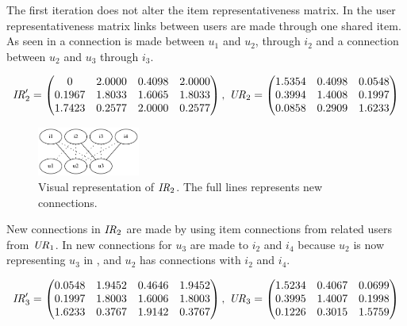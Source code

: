 \FloatBarrier

The first iteration does not alter the item representativeness matrix. In the user representativeness matrix links between users are made through one shared item.  As seen in  a connection is made between $u_1$ and $u_2$, through $i_2$ and a connection between $u_2$ and $u_3$ through $i_3$.

\[
    \mathit{IR}'_2 = \begin{pmatrix}
             0 &  2.0000 &  0.4098 &  2.0000 \\
        0.1967 &  1.8033 &  1.6065 &  1.8033 \\
        1.7423 &  0.2577 &  2.0000 &  0.2577
    \end{pmatrix},
\;
    \mathit{UR}_2 = \begin{pmatrix}
        1.5354 &  0.4098 &  0.0548 \\
        0.3994 &  1.4008 &  0.1997 \\
        0.0858 &  0.2909 &  1.6233
    \end{pmatrix}
\]

\FloatBarrier

\begin{figure}[h!]
    \centering
    \includegraphics[width=0.3\textwidth]{fig/example_run/item_user_ir2.png}
    \caption{Visual representation of $\mathit{IR}_2$. The full lines represents new connections.}
    \label{fig:link:ir2}
\end{figure}

\FloatBarrier

New connections in $\mathit{IR}_2$ are made by using item connections from related users from $\mathit{UR}_1$. In  new connections for $u_3$ are made to $i_2$ and $i_4$ because $u_2$ is now representing $u_3$ in , and $u_2$ has connections with $i_2$ and $i_4$.

\[
    \mathit{IR}'_3 = \begin{pmatrix}
        0.0548 &  1.9452 &  0.4646 &  1.9452 \\
        0.1997 &  1.8003 &  1.6006 &  1.8003 \\
        1.6233 &  0.3767 &  1.9142 &  0.3767
    \end{pmatrix},
\;
    \mathit{UR}_3 = \begin{pmatrix}
        1.5234 &  0.4067 &  0.0699 \\
        0.3995 &  1.4007 &  0.1998 \\
        0.1226 &  0.3015 &  1.5759
    \end{pmatrix}
\]

